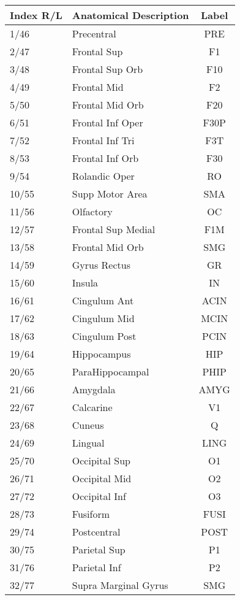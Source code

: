 \begin{table}[htbp]
\begin{center}
\begin{tabular}{l | l | c}
  
  Index R/L & Anatomical Description & Label \\
  \hline  \hline                     
  1/46 & Precentral & PRE   \\ 
  2/47 & Frontal Sup & F1 \\
3/48 & Frontal Sup Orb    &      F10 \\
4/49 & Frontal Mid        &       F2\\
5/50 & Frontal Mid Orb    &      F20\\
6/51 & Frontal Inf Oper   &    F30P\\
7/52 & Frontal Inf Tri    &     F3T\\
8/53 & Frontal Inf Orb    &      F30\\
9/54 & Rolandic Oper      &      RO\\
10/55 & Supp Motor Area  &      SMA\\
11/56 & Olfactory          &      OC\\
12/57 & Frontal Sup Medial  &   F1M\\
13/58 & Frontal Mid Orb     &   SMG\\
14/59 & Gyrus Rectus         &    GR\\
15/60 & Insula              &      IN\\
16/61 & Cingulum Ant       &   ACIN\\
17/62 & Cingulum Mid        &  MCIN\\
18/63 & Cingulum Post        & PCIN\\
19/64 & Hippocampus         &    HIP\\
20/65 & ParaHippocampal     &  PHIP\\
21/66 & Amygdala           &  AMYG\\
22/67 & Calcarine          &       V1\\
23/68 & Cuneus             &        Q\\
24/69 & Lingual            &   LING\\
25/70 & Occipital Sup      &       O1\\
26/71 & Occipital Mid      &       O2\\
27/72 & Occipital Inf      &       O3\\
28/73 & Fusiform           &    FUSI\\
29/74 & Postcentral        &   POST\\
30/75 & Parietal Sup       &       P1\\
31/76 & Parietal Inf       &       P2\\
32/77 & Supra Marginal Gyrus  &  SMG\\

\end{tabular}
\end{center}
\end{table}
